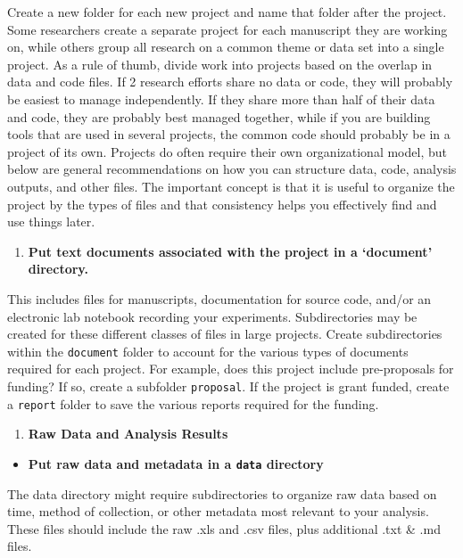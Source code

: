 \documentclass[
]{book}
\providecommand{\tightlist}{%
  \setlength{\itemsep}{0pt}\setlength{\parskip}{0pt}}
\begin{document}
Create a new folder for each new project and name that folder after the project. Some researchers create a separate project for each manuscript they are working on, while others group all research on a common theme or data set into a single project.
As a rule of thumb, divide work into projects based on the overlap in data and code files. If 2 research efforts share no data or code, they will probably be easiest to manage independently. If they share more than half of their data and code, they are probably best managed together, while if you are building tools that are used in several projects, the common code should probably be in a project of its own. Projects do often require their own organizational model, but below are general recommendations on how you can structure data, code, analysis outputs, and other files. The important concept is that it is useful to organize the project by the types of files and that consistency helps you effectively find and use things later.

\begin{enumerate}
\def\labelenumi{\arabic{enumi}.}
\setcounter{enumi}{1}
\tightlist
\item
  \textbf{Put text documents associated with the project in a `document' directory.}
\end{enumerate}

This includes files for manuscripts, documentation for source code, and/or an electronic lab notebook recording your experiments. Subdirectories may be created for these different classes of files in large projects. Create subdirectories within the \texttt{document} folder to account for the various types of documents required for each project. For example, does this project include pre-proposals for funding? If so, create a subfolder \texttt{proposal}. If the project is grant funded, create a \texttt{report} folder to save the various reports required for the funding.

\begin{enumerate}
\def\labelenumi{\arabic{enumi}.}
\setcounter{enumi}{2}
\tightlist
\item
  \textbf{Raw Data and Analysis Results}
\end{enumerate}

\begin{itemize}
\tightlist
\item
  \textbf{Put raw data and metadata in a \texttt{data} directory}
\end{itemize}

The data directory might require subdirectories to organize raw data based on time, method of collection, or other metadata most relevant to your analysis. These files should include the raw .xls and .csv files, plus additional .txt \& .md files.
\end{document}
